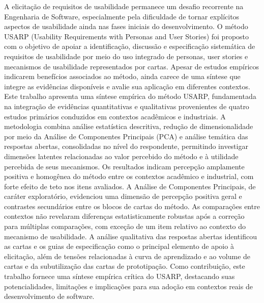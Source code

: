 A elicitação de requisitos de usabilidade permanece um desafio recorrente na Engenharia de
Software, especialmente pela dificuldade de tornar explícitos aspectos de usabilidade ainda nas
fases iniciais do desenvolvimento. O método USARP (Usability Requirements with Personas
and User Stories) foi proposto com o objetivo de apoiar a identificação, discussão e especificação
sistemática de requisitos de usabilidade por meio do uso integrado de personas, user stories e
mecanismos de usabilidade representados por cartas. Apesar de estudos empíricos indicarem
benefícios associados ao método, ainda carece de uma síntese que integre as evidências disponíveis
e avalie sua aplicação em diferentes contextos. Este trabalho apresenta uma síntese empírica do
método USARP, fundamentada na integração de evidências quantitativas e qualitativas provenientes
de quatro estudos primários conduzidos em contextos acadêmicos e industriais. A metodologia
combina análise estatística descritiva, redução de dimensionalidade por meio da Análise de
Componentes Principais (PCA) e análise temática das respostas abertas, consolidadas no nível do
respondente, permitindo investigar dimensões latentes relacionadas ao valor percebido do método
e à utilidade percebida de seus mecanismos. Os resultados indicam percepção amplamente positiva
e homogênea do método entre os contextos acadêmico e industrial, com forte efeito de teto nos
itens avaliados. A Análise de Componentes Principais, de caráter exploratório, evidenciou uma
dimensão de percepção positiva geral e contrastes secundários entre os blocos de cartas do método.
As comparações entre contextos não revelaram diferenças estatisticamente robustas após a correção
para múltiplas comparações, com exceção de um item relativo ao contexto do mecanismo de
usabilidade. A análise qualitativa das respostas abertas identificou as cartas e os guias de
especificação como o principal elemento de apoio à elicitação, além de tensões relacionadas à curva
de aprendizado e ao volume de cartas e da subutilização das cartas de prototipação. Como
contribuição, este trabalho fornece uma síntese empírica crítica do USARP, destacando suas
potencialidades, limitações e implicações para sua adoção em contextos reais de desenvolvimento
de software.

